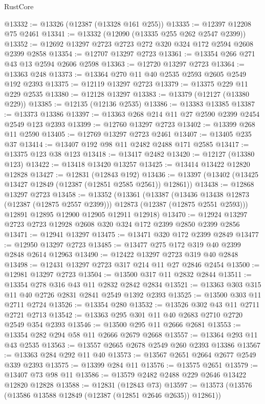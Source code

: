 \begin{lexlean}{RustCore}
\begin{coremodule}
@13332 := @13326 (@12387 (@13328 @161 @255))
@13335 := @12397 @12208 @75 @2461
@13341 := @13332 (@12090 (@13335 @255 @262 @2547 @2399))
@13352 := @12692 @13297 @2723 @2723 @272 @320 @324 @172 @2594 @2608 @2399 @2858
@13354 := @12707 @13297 @2723
@13361 := @13354 @266 @271 @43 @13 @2594 @2606 @2598
@13363 := @12720 @13297 @2723
@13364 := @13363 @248
@13373 := @13364 @270 @11 @40 @2535 @2593 @2605 @2549 @192 @2393
@13375 := @12119 @13297 @2723
@13379 := @13375 @229 @11 @229 @2535
@13380 := @12128 @13297
@13383 := @13379 (@12127 (@13380 @229))
@13385 := @12135 (@12136 @2535)
@13386 := @13383 @13385
@13387 := @13373 @13386
@13397 := @13363 @268 @214 @11 @27 @2590 @2399 @2454 @2549 @123 @2393
@13399 := @12760 @13297 @2723
@13402 := @13399 @268 @11 @2590
@13405 := @12769 @13297 @2723 @2461
@13407 := @13405 @235 @37
@13414 := @13407 @192 @98 @11 @2482 @2488 @171 @2585
@13417 := @13375 @123 @38 @123
@13418 := @13417 @2482
@13420 := @12127 (@13380 @123)
@13422 := @13418 @13420 @13257
@13425 := @13414 @13422 @12820 @12828
@13427 := @12831 (@12843 @192)
@13436 := @13397 (@13402 (@13425 @13427 @12849 (@12387 (@12851 @2585 @2561)) @12861))
@13438 := @12868 @13297 @2723
@13458 := @13352
    (@13361
      (@13387
        (@13436 @13438 @12873 (@12387 (@12875 @2557 @2399)))
        @12873
        (@12387 (@12875 @2551 @2593)))
      @12891
      @12895
      @12900
      @12905
      @12911
      @12918)
@13470 := @12924 @13297 @2723 @2723 @12928 @2608 @320 @324 @172 @2399 @2850 @2399 @2856
@13471 := @12941 @13297
@13475 := @13471 @320 @172 @2399 @2849
@13477 := @12950 @13297 @2723
@13485 := @13477 @275 @172 @319 @40 @2399 @2848 @2614 @12963
@13490 := @12422 @13297 @2723 @319 @40 @2848
@13498 := @12431 @13297 @2723 @317 @214 @11 @27 @2846 @2454
@13500 := @12981 @13297 @2723
@13504 := @13500 @317 @11 @2832 @2844
@13511 := @13354 @278 @316 @43 @11 @2832 @2842 @2834
@13521 := @13363 @303 @315 @11 @40 @2726 @2831 @2841 @2549 @1392 @2393
@13525 := @13500 @303 @11 @2711 @2724
@13526 := @13354 @280
@13532 := @13526 @302 @43 @11 @2711 @2721 @2713
@13542 := @13363 @295 @301 @11 @40 @2683 @2710 @2720 @2549 @354 @2393
@13546 := @13500 @295 @11 @2666 @2681
@13553 := @13354 @282 @294 @58 @11 @2666 @2679 @2668
@13557 := @13364 @293 @11 @43 @2535
@13563 := @13557 @2665 @2678 @2549 @260 @2393 @13386
@13567 := @13363 @284 @292 @11 @40
@13573 := @13567 @2651 @2664 @2677 @2549 @339 @2393
@13575 := @13399 @284 @11
@13576 := @13575 @2651
@13579 := @13407 @73 @98 @11
@13586 := @13579 @2482 @2488 @229 @2646 @13422 @12820 @12828
@13588 := @12831 (@12843 @73)
@13597 := @13573 (@13576 (@13586 @13588 @12849 (@12387 (@12851 @2646 @2635)) @12861))

\end{coremodule}
\end{lexlean}
